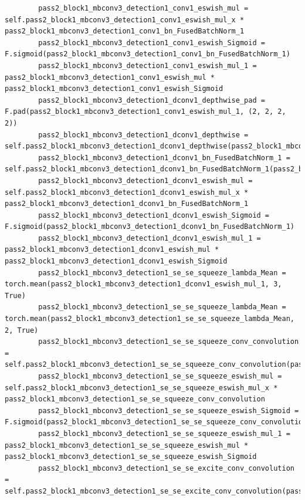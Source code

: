 \documentclass{fisatprojectfinal}
\begin{document}
\begin{appendices}
\begin{lstlisting}
        pass2_block1_mbconv3_detection1_conv1_eswish_mul = self.pass2_block1_mbconv3_detection1_conv1_eswish_mul_x * pass2_block1_mbconv3_detection1_conv1_bn_FusedBatchNorm_1
        pass2_block1_mbconv3_detection1_conv1_eswish_Sigmoid = F.sigmoid(pass2_block1_mbconv3_detection1_conv1_bn_FusedBatchNorm_1)
        pass2_block1_mbconv3_detection1_conv1_eswish_mul_1 = pass2_block1_mbconv3_detection1_conv1_eswish_mul * pass2_block1_mbconv3_detection1_conv1_eswish_Sigmoid
        pass2_block1_mbconv3_detection1_dconv1_depthwise_pad = F.pad(pass2_block1_mbconv3_detection1_conv1_eswish_mul_1, (2, 2, 2, 2))
        pass2_block1_mbconv3_detection1_dconv1_depthwise = self.pass2_block1_mbconv3_detection1_dconv1_depthwise(pass2_block1_mbconv3_detection1_dconv1_depthwise_pad)
        pass2_block1_mbconv3_detection1_dconv1_bn_FusedBatchNorm_1 = self.pass2_block1_mbconv3_detection1_dconv1_bn_FusedBatchNorm_1(pass2_block1_mbconv3_detection1_dconv1_depthwise)
        pass2_block1_mbconv3_detection1_dconv1_eswish_mul = self.pass2_block1_mbconv3_detection1_dconv1_eswish_mul_x * pass2_block1_mbconv3_detection1_dconv1_bn_FusedBatchNorm_1
        pass2_block1_mbconv3_detection1_dconv1_eswish_Sigmoid = F.sigmoid(pass2_block1_mbconv3_detection1_dconv1_bn_FusedBatchNorm_1)
        pass2_block1_mbconv3_detection1_dconv1_eswish_mul_1 = pass2_block1_mbconv3_detection1_dconv1_eswish_mul * pass2_block1_mbconv3_detection1_dconv1_eswish_Sigmoid
        pass2_block1_mbconv3_detection1_se_se_squeeze_lambda_Mean = torch.mean(pass2_block1_mbconv3_detection1_dconv1_eswish_mul_1, 3, True)
        pass2_block1_mbconv3_detection1_se_se_squeeze_lambda_Mean = torch.mean(pass2_block1_mbconv3_detection1_se_se_squeeze_lambda_Mean, 2, True)
        pass2_block1_mbconv3_detection1_se_se_squeeze_conv_convolution = self.pass2_block1_mbconv3_detection1_se_se_squeeze_conv_convolution(pass2_block1_mbconv3_detection1_se_se_squeeze_lambda_Mean)
        pass2_block1_mbconv3_detection1_se_se_squeeze_eswish_mul = self.pass2_block1_mbconv3_detection1_se_se_squeeze_eswish_mul_x * pass2_block1_mbconv3_detection1_se_se_squeeze_conv_convolution
        pass2_block1_mbconv3_detection1_se_se_squeeze_eswish_Sigmoid = F.sigmoid(pass2_block1_mbconv3_detection1_se_se_squeeze_conv_convolution)
        pass2_block1_mbconv3_detection1_se_se_squeeze_eswish_mul_1 = pass2_block1_mbconv3_detection1_se_se_squeeze_eswish_mul * pass2_block1_mbconv3_detection1_se_se_squeeze_eswish_Sigmoid
        pass2_block1_mbconv3_detection1_se_se_excite_conv_convolution = self.pass2_block1_mbconv3_detection1_se_se_excite_conv_convolution(pass2_block1_mbconv3_detection1_se_se_squeeze_eswish_mul_1)

\end{lstlisting}
\end{appendices}
\end{document}
